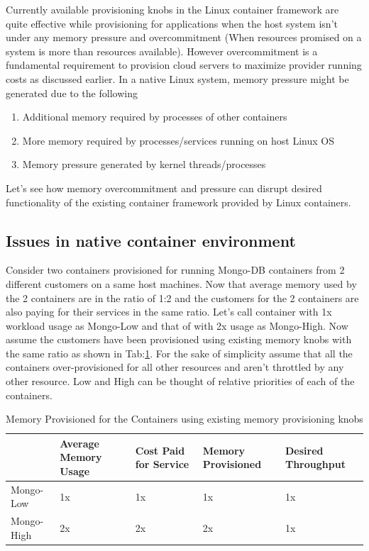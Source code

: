    Currently available provisioning knobs in the Linux container framework are quite effective while provisioning for applications when 
the host system isn't under any memory pressure and overcommitment (When resources promised on a system is more than resources available). 
However overcommitment is a fundamental requirement to provision cloud servers to maximize provider running costs as discussed earlier. In a 
native Linux system, memory pressure might be generated due to the following 

      \begin{enumerate}
	\item Additional memory required by processes of other containers
	\item More memory required by processes/services running on host Linux OS
	\item Memory pressure generated by kernel threads/processes
      \end{enumerate}
      
      Let's see how memory overcommitment and pressure can disrupt desired functionality of the existing container framework provided by 
Linux containers.

    \subsection{Issues in native container environment}	
    
    Consider two containers provisioned for running Mongo-DB containers from 2 different customers on a same host machines. Now that 
average memory used by the 2 containers are in the ratio of 1:2 and the customers for the 2 containers are also paying for their services in 
the same ratio. Let's call container with 1x workload usage as Mongo-Low and that of with 2x usage as Mongo-High. Now assume the customers 
have been provisioned using existing memory knobs with the same ratio as shown in Tab:\ref{table_initial}. For the sake of simplicity assume 
that all the containers over-provisioned for all other resources and aren't throttled by any other resource. Low and High can be thought of 
relative priorities of each of the containers.
	
	\vspace*{1em}	
	\begin{table}[!h]
	  \begin{center}
	    \begin{tabular}{ l | p{3cm} | p{2.2cm} | p{2.2cm} | p{2.2cm} }	      	    
		  & Average Memory Usage & Cost Paid for Service & Memory Provisioned & Desired Throughput \\ 
	      \hline
	      \hline
	      Mongo-Low  & 1x & 1x & 1x & 1x \\  
	      \hline
	      Mongo-High & 2x & 2x & 2x & 1x \\
		
	    \end{tabular}
	  \caption{Memory Provisioned for the Containers using existing memory provisioning knobs}
	  \label{table_initial}
	  \end{center}	  
	\end{table}
	\vspace*{1em}
	
